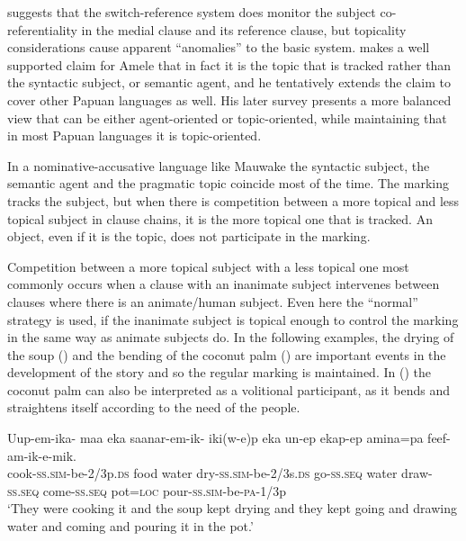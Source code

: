 \citet[242--243]{Reesink1983a} suggests that the switch-reference system does monitor the subject co-referentiality in the medial clause and its reference clause, but topicality considerations cause apparent ``anomalies'' to the basic system.  \citet{Roberts1988b} makes a well supported claim for Amele that in fact it is the topic that is tracked rather than the syntactic subject, or semantic agent, and he tentatively extends the claim to cover other Papuan languages as well. His later survey \citep{Roberts1997} presents a more balanced view that  can be either agent-oriented or topic-oriented, while maintaining that in most Papuan languages it is topic-oriented. 

In a nominative-accusative language like Mauwake the syntactic subject, the semantic agent and the pragmatic topic coincide most of the time. The  marking tracks the subject, but when there is competition between a more topical and less topical subject in clause chains, it is the more topical one that is tracked. An object, even if it is the topic, does not participate in the  marking.

Competition between a more topical subject with a less topical one most commonly occurs when a clause with an inanimate subject intervenes between clauses where there is an animate/human subject. Even here the ``normal''  strategy is used, if the inanimate subject is topical enough to control the  marking in the same way as animate subjects do. In the following examples, the drying of the soup () and the bending of the coconut palm () are important events in the development of the story and so the regular  marking is maintained. In () the coconut palm can also be interpreted as a volitional participant, as it bends and straightens itself according to the need of the people.

\ea%
\label{ex:x1474}
\gll Uup-em-ika- \textstyleEmphasizedVernacularWords{} maa  eka  saanar-em-ik- iki(w-e)p  eka  un-ep  ekap-ep  amina=pa feef-am-ik-e-mik.\\
cook-\textsc{ss}.\textsc{sim}-be-2/3p.\textsc{ds} food water  dry-\textsc{ss}.\textsc{sim}-be-2/3s.\textsc{ds} go-\textsc{ss}.\textsc{seq}  water  draw-\textsc{ss}.\textsc{seq} come-\textsc{ss}.\textsc{seq} pot=\textsc{loc} pour-\textsc{ss}.\textsc{sim}-be-\textsc{pa}-1/3p\\
\glt`They were cooking it and the soup kept drying and they kept going and drawing water and coming and pouring it in the pot.'
\z


